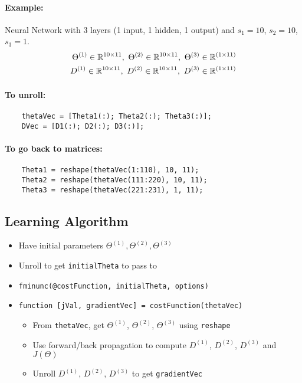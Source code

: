 \paragraph{Example:}
Neural Network with 3 layers (1 input, 1 hidden, 1 output) and
$s_1 = 10$, $s_2 = 10$, $s_3 = 1$.
\begin{align*}
	\Theta^{(1)} \in \mathbb{R}^{10 \times 11},\ \Theta^{(2)} \in \mathbb{R}^{10 \times 11},\
	\Theta^{(3)} \in \mathbb{R}^{(1 \times 11)} \\
	D^{(1)} \in \mathbb{R}^{10 \times 11},\ D^{(2)} \in \mathbb{R}^{10 \times 11},\
	D^{(3)} \in \mathbb{R}^{(1 \times 11)}      \\
\end{align*}

\paragraph{To unroll:}
\begin{verbatim}
	thetaVec = [Theta1(:); Theta2(:); Theta3(:)];
	DVec = [D1(:); D2(:); D3(:)];
\end{verbatim}

\paragraph{To go back to matrices:}
\begin{verbatim}
	Theta1 = reshape(thetaVec(1:110), 10, 11);
	Theta2 = reshape(thetaVec(111:220), 10, 11);
	Theta3 = reshape(thetaVec(221:231), 1, 11);
\end{verbatim}

\subsection{Learning Algorithm}
\begin{itemize}[label={}]
	\item Have initial parameters $\Theta^{(1)}, \Theta^{(2)}, \Theta^{(3)}$
	\item Unroll to get \texttt{initialTheta} to pass to
	\item \texttt{fminunc(@costFunction, initialTheta, options)}
	\item \texttt{function [jVal, gradientVec] = costFunction(thetaVec)}
	      \begin{itemize}[label={}]
		      \item From \texttt{thetaVec},
		            get $\Theta^{(1)}$, $\Theta^{(2)}$, $\Theta^{(3)}$
		            using \texttt{reshape}
		      \item Use forward/back propagation to compute
		            $D^{(1)}$, $D^{(2)}$, $D^{(3)}$ and $J(\Theta)$
		      \item Unroll $D^{(1)}$, $D^{(2)}$, $D^{(3)}$ to get
		            \texttt{gradientVec}
	      \end{itemize}
\end{itemize}

